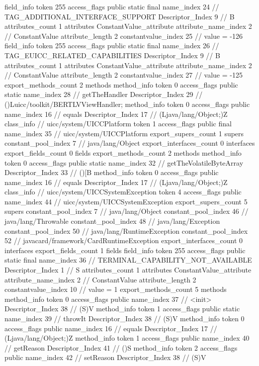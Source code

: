 {{{{{{{				}
				}
			}
			field_info {
				token	255
				access_flags	public static final
				name_index	24		// TAG_ADDITIONAL_INTERFACE_SUPPORT
				Descriptor_Index	9		// B
				attributes_count	1
				attributes {
				ConstantValue_attribute {
					attribute_name_index	2		// ConstantValue
					attribute_length	2
					constantvalue_index	25		// value = -126
				}
				}
			}
			field_info {
				token	255
				access_flags	public static final
				name_index	26		// TAG_EUICC_RELATED_CAPABILITIES
				Descriptor_Index	9		// B
				attributes_count	1
				attributes {
				ConstantValue_attribute {
					attribute_name_index	2		// ConstantValue
					attribute_length	2
					constantvalue_index	27		// value = -125
				}
				}
			}
			}
			export_methods_count	2
			methods {
				method_info {
					token	0
					access_flags	public static
					name_index	28		// getTheHandler
					Descriptor_Index	29		// ()Luicc/toolkit/BERTLVViewHandler;
				}
				method_info {
					token	0
					access_flags	public
					name_index	16		// equals
					Descriptor_Index	17		// (Ljava/lang/Object;)Z
				}
			}
		}
		class_info {		// uicc/system/UICCPlatform
			token	1
			access_flags	public final
			name_index	35		// uicc/system/UICCPlatform
			export_supers_count	1
			supers {
				constant_pool_index	7		// java/lang/Object
			}
			export_interfaces_count	0
			interfaces {
			}
			export_fields_count	0
			fields {
			}
			export_methods_count	2
			methods {
				method_info {
					token	0
					access_flags	public static
					name_index	32		// getTheVolatileByteArray
					Descriptor_Index	33		// ()[B
				}
				method_info {
					token	0
					access_flags	public
					name_index	16		// equals
					Descriptor_Index	17		// (Ljava/lang/Object;)Z
				}
			}
		}
		class_info {		// uicc/system/UICCSystemException
			token	4
			access_flags	public
			name_index	44		// uicc/system/UICCSystemException
			export_supers_count	5
			supers {
				constant_pool_index	7		// java/lang/Object
				constant_pool_index	46		// java/lang/Throwable
				constant_pool_index	48		// java/lang/Exception
				constant_pool_index	50		// java/lang/RuntimeException
				constant_pool_index	52		// javacard/framework/CardRuntimeException
			}
			export_interfaces_count	0
			interfaces {
			}
			export_fields_count	1
			fields {
			field_info {
				token	255
				access_flags	public static final
				name_index	36		// TERMINAL_CAPABILITY_NOT_AVAILABLE
				Descriptor_Index	1		// S
				attributes_count	1
				attributes {
				ConstantValue_attribute {
					attribute_name_index	2		// ConstantValue
					attribute_length	2
					constantvalue_index	10		// value = 1
				}
				}
			}
			}
			export_methods_count	5
			methods {
				method_info {
					token	0
					access_flags	public
					name_index	37		// <init>
					Descriptor_Index	38		// (S)V
				}
				method_info {
					token	1
					access_flags	public static
					name_index	39		// throwIt
					Descriptor_Index	38		// (S)V
				}
				method_info {
					token	0
					access_flags	public
					name_index	16		// equals
					Descriptor_Index	17		// (Ljava/lang/Object;)Z
				}
				method_info {
					token	1
					access_flags	public
					name_index	40		// getReason
					Descriptor_Index	41		// ()S
				}
				method_info {
					token	2
					access_flags	public
					name_index	42		// setReason
					Descriptor_Index	38		// (S)V
				}
			}
		}
	}
}
